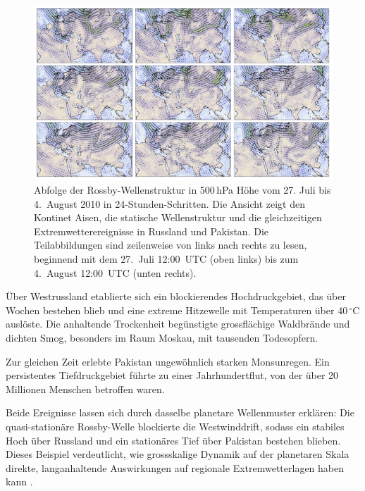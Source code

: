 \begin{figure}
	\centering
	\includegraphics[width=\textwidth]{papers/rossby/images/rossby_2010.pdf}
	\caption{Abfolge der Rossby-Wellenstruktur in 500\,hPa Höhe vom 27. Juli bis 4.\ August 2010 in 24-Stunden-Schritten.
		Die Ansicht zeigt den Kontinet Aisen, die statische Wellenstruktur und die
		gleichzeitigen Extremwetterereignisse in Russland und Pakistan.
		Die Teilabbildungen sind zeilenweise von links nach rechts zu lesen, beginnend mit dem 27.\ Juli 12:00~UTC (oben links)
		bis zum 4.\ August 12:00~UTC (unten rechts).}
	\label{fig:rossby_grid_2010}
\end{figure}


Über Westrussland etablierte sich ein blockierendes Hochdruckgebiet, das über Wochen bestehen blieb und eine extreme Hitzewelle mit Temperaturen über 40\,$^\circ$C auslöste.
Die anhaltende Trockenheit begünstigte grossflächige Waldbrände und dichten Smog, besonders im Raum Moskau, mit tausenden Todesopfern.

Zur gleichen Zeit erlebte Pakistan ungewöhnlich starken Monsunregen. Ein
persistentes Tiefdruckgebiet führte zu einer Jahrhundertflut, von der über 20
Millionen Menschen betroffen waren.

Beide Ereignisse lassen sich durch dasselbe planetare Wellenmuster erklären:
Die quasi-stationäre Rossby-Welle blockierte die Westwinddrift, sodass ein
stabiles Hoch über Russland und ein stationäres Tief über Pakistan bestehen
blieben. Dieses Beispiel verdeutlicht, wie grossskalige Dynamik auf der
planetaren Skala direkte, langanhaltende Auswirkungen auf regionale
Extremwetterlagen haben kann \cite{rossby:petoukhov2013}.
